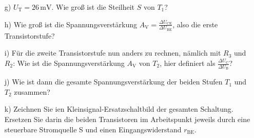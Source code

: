 {\begin{itemize}
   Erläutern Sie in Stichworten die Arbeitspunktstabiliserung der gesamten Schaltung aufgrund der Gegenkopplung über $R_4$.
   \item[g)]
   $U_\mathrm{T} = 26\, \mathrm{mV}$. Wie groß ist die Steilheit $S$ von $T_\mathrm{1}$?
   \item[h)]
   Wie groß ist die Spannungsverstärkung $A_\mathrm{V} = \frac{\Delta U_\mathrm{CE}}{\Delta U_\mathrm{BE}}$, also die erste Transistorstufe?
   \item[i)]
   Für die zweite Transistorstufe nun anders zu rechnen, nämlich mit $R_3$ und $R_2$: 
   Wie ist die Spannungsverstärkung $A_\mathrm{V}$ von $T_\mathrm{2}$, hier definiert als $\frac{\Delta U_\mathrm{C}}{\Delta U_\mathrm{B}}$?
   \item[j)]
   Wie ist dann die gesamte Spannungsverstärkung der beiden Stufen $T_\mathrm{1}$ und $T_\mathrm{2}$ zusammen?
   \item[k)]
   Zeichnen Sie ien Kleinsignal-Ersatzschaltbild der gesamten Schaltung. Ersetzen Sie darin die beiden Transistoren im Arbeitspunkt jeweils durch eine steuerbare Stromquelle S und einen Eingangswiderstand $r_\mathrm{BE}$.
\end{itemize}





}
